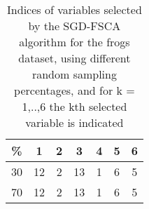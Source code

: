 \begin{table}
	\begin{center}
		\begin{tabular}{c c c c c c c}
			\% & 1 & 2 & 3 & 4 & 5 & 6 \\
			\hline
			30 & 12 & 2 & 13 & 1 & 6 & 5 \\
			70 & 12 & 2 & 13 & 1 & 6 & 5 \\
		\end{tabular}
	\end{center}
	\caption{Indices of variables selected by the SGD-FSCA algorithm for the frogs dataset, using different random sampling percentages, and for k = 1,..,6 the kth selected variable is indicated}
\end{table}